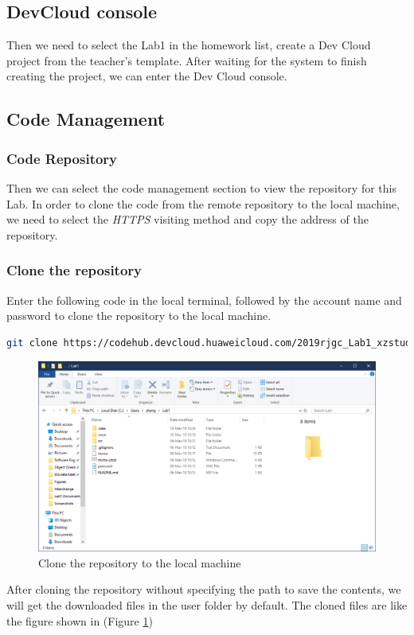 \documentclass[a4paper]{report}
\begin{document}
\subsection{DevCloud console}
Then we need to select the Lab1 in the homework list, create a Dev Cloud project from the teacher's template. After waiting for the system to finish creating the project, we can enter the Dev Cloud console. 
\subsection{Code Management}
\subsubsection{Code Repository}
Then we can select the code management section to view the repository for this Lab. In order to clone the code from the remote repository to the local machine, we need to select the \emph{HTTPS} visiting method and copy the address of the repository.
\subsubsection{Clone the repository}
Enter the following code in the local terminal, followed by the account name and password to clone the repository to the local machine. 
\begin{lstlisting}[language=bash]
git clone https://codehub.devcloud.huaweicloud.com/2019rjgc_Lab1_xzstudent00300001/Lab1.git
\end{lstlisting}
\begin{figure}
  \centering
  \includegraphics[width=12cm]{Figures/Cloned.png}
  \caption{Clone the repository to the local machine}\label{1}
\end{figure}
After cloning the repository without specifying the path to save the contents, we will get the downloaded files in the user folder by default. The cloned files are like the figure shown in (Figure \ref{1})
\end{document}
